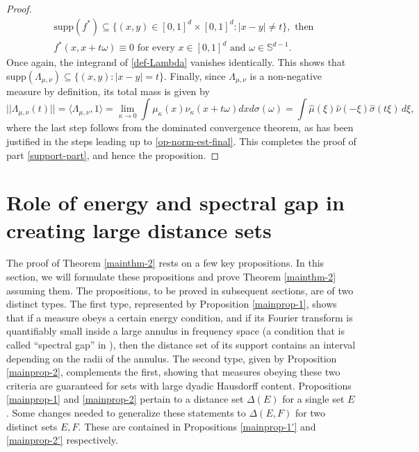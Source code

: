 \documentclass[a4paper,11pt]{amsart}
\numberwithin{equation}{section}
\begin{document}
\begin{proof}
\begin{align*} 
&\text{supp}(f^{\ast}) \subseteq \{(x,y) \in [0,1]^{d} \times [0,1]^d : |x - y| \ne t \}, \text{ then } \\ 
&f^{\ast}(x, x+t\omega)  \equiv 0 \text{ for every } x  \in [0,1]^d \text{ and } \omega \in \mathbb S^{d-1}. 
\end{align*} 
Once again, the integrand of \eqref{def-Lambda} vanishes identically. This shows that supp$(\Lambda_{\mu, \nu}) \subseteq \{(x, y) : |x - y| = t \}$.  Finally, since $\Lambda_{\mu, \nu}$ is a non-negative measure by definition, its total mass is given by 
\[ ||\Lambda_{\mu, \nu}(t)|| = \langle \Lambda_{\mu, \nu}, 1\rangle = \lim_{\kappa \rightarrow 0}  \int \mu_{\kappa}(x) \nu_{\kappa}(x + t \omega) dx d\sigma(\omega) =  \int \widehat{\mu} (\xi) \widehat{\nu}(-\xi) \widehat{\sigma}(t \xi) \, d\xi, \] 
where the last step follows from the dominated convergence theorem, as has been justified in the steps leading up to \eqref{op-norm-est-final}. This completes the proof of part \eqref{support-part}, and hence the proposition.     
\end{proof} 

\section{Role of energy and spectral gap in creating large distance sets} \label{Energy-and-Spectral-Gap-section}
The proof of Theorem \ref{mainthm-2} rests on a few key propositions. In this section, we will formulate these propositions and prove Theorem \ref{mainthm-2} assuming them. The propositions, to be proved in subsequent sections, are of two distinct types. The first type, represented by Proposition \ref{mainprop-1}, shows that if a measure obeys a certain energy condition, and if its Fourier transform is quantifiably small inside a large annulus in frequency space (a condition that is called ``spectral gap'' in \cite{Kuca-Orponen-Sahlsten}), then the distance set of its support contains an interval depending on the radii of the annulus.  The second type, given by Proposition \ref{mainprop-2}, complements the first, showing that measures obeying these two criteria are guaranteed for sets with large dyadic Hausdorff content. Propositions \ref{mainprop-1} and \ref{mainprop-2} pertain to a distance set $\Delta(E)$ for a single set $E$. Some changes needed to generalize these statements to $\Delta(E, F)$ for two distinct sets $E, F$. These are contained in Propositions \ref{mainprop-1'} and \ref{mainprop-2'} respectively. 
\end{document}
